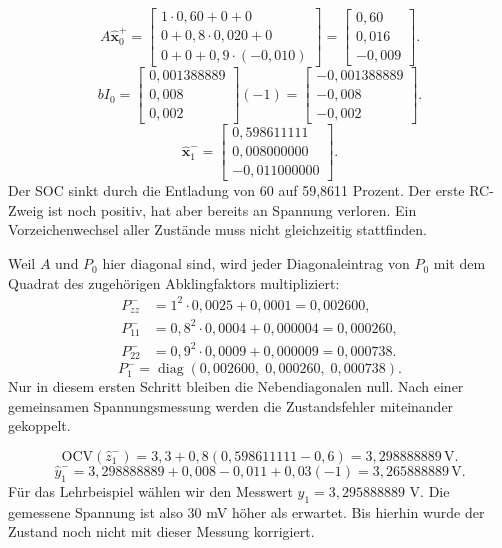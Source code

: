 \[
A\hat{\mathbf x}_0^+
=\begin{bmatrix}
1\cdot0{,}60+0+0\\
0+0{,}8\cdot0{,}020+0\\
0+0+0{,}9\cdot(-0{,}010)
\end{bmatrix}
=\begin{bmatrix}0{,}60\\0{,}016\\-0{,}009\end{bmatrix}.
\]
\[
bI_0=\begin{bmatrix}0{,}001388889\\0{,}008\\0{,}002\end{bmatrix}(-1)
=\begin{bmatrix}-0{,}001388889\\-0{,}008\\-0{,}002\end{bmatrix}.
\]
\[
\boxed{\hat{\mathbf x}_1^-=\begin{bmatrix}0{,}598611111\\0{,}008000000\\-0{,}011000000\end{bmatrix}.}
\]
Der SOC sinkt durch die Entladung von 60 auf 59,8611 Prozent. Der erste RC-Zweig ist noch positiv, hat aber bereits an Spannung verloren. Ein Vorzeichenwechsel aller Zustände muss nicht gleichzeitig stattfinden.

Weil $A$ und $P_0$ hier diagonal sind, wird jeder Diagonaleintrag von $P_0$ mit dem Quadrat des zugehörigen Abklingfaktors multipliziert:
\[
\begin{aligned}
P^-_{zz}&=1^2\cdot0{,}0025+0{,}0001=0{,}002600,\\
P^-_{11}&=0{,}8^2\cdot0{,}0004+0{,}000004=0{,}000260,\\
P^-_{22}&=0{,}9^2\cdot0{,}0009+0{,}000009=0{,}000738.
\end{aligned}
\]
\[
\boxed{P_1^-=\operatorname{diag}(0{,}002600,\;0{,}000260,\;0{,}000738).}
\]
Nur in diesem ersten Schritt bleiben die Nebendiagonalen null. Nach einer gemeinsamen Spannungsmessung werden die Zustandsfehler miteinander gekoppelt.

\[
\mathrm{OCV}(\hat z_1^-)=3{,}3+0{,}8(0{,}598611111-0{,}6)
=3{,}298888889\,\mathrm V.
\]
\[
\hat y_1^-=3{,}298888889+0{,}008-0{,}011+0{,}03(-1)
=\boxed{3{,}265888889\,\mathrm V}.
\]
Für das Lehrbeispiel wählen wir den Messwert $y_1=3{,}295888889$ V. Die gemessene Spannung ist also 30 mV höher als erwartet. Bis hierhin wurde der Zustand noch nicht mit dieser Messung korrigiert.

